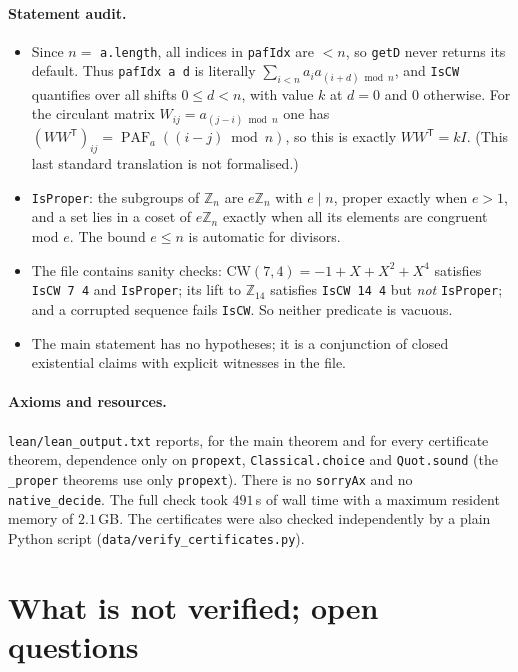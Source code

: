 \documentclass[11pt]{article}
\numberwithin{equation}{section}
\theoremstyle{definition}
\theoremstyle{remark}
\newcommand{\Z}{\mathbb Z}
\newcommand{\CW}{\mathrm{CW}}
\DeclareMathOperator{\PAF}{PAF}
\begin{document}
\paragraph{Statement audit.}
\begin{itemize}
\item Since $n=$ \texttt{a.length}, all indices in \texttt{pafIdx} are $<n$, so \texttt{getD}
never returns its default. Thus \texttt{pafIdx a d} is literally
$\sum_{i<n}a_ia_{(i+d)\bmod n}$, and \texttt{IsCW} quantifies over all shifts $0\le d<n$, with
value $k$ at $d=0$ and $0$ otherwise. For the circulant matrix $W_{ij}=a_{(j-i)\bmod n}$ one has
$(WW^{\mathsf T})_{ij}=\PAF_a((i-j)\bmod n)$, so this is exactly $WW^{\mathsf T}=kI$. (This last
standard translation is not formalised.)
\item \texttt{IsProper}: the subgroups of $\Z_n$ are $e\Z_n$ with $e\mid n$, proper exactly when
$e>1$, and a set lies in a coset of $e\Z_n$ exactly when all its elements are congruent mod $e$.
The bound $e\le n$ is automatic for divisors.
\item The file contains sanity checks: $\CW(7,4)=-1+X+X^2+X^4$ satisfies
\texttt{IsCW 7 4} and \texttt{IsProper}; its lift to $\Z_{14}$ satisfies \texttt{IsCW 14 4} but
\emph{not} \texttt{IsProper}; and a corrupted sequence fails \texttt{IsCW}. So neither predicate
is vacuous.
\item The main statement has no hypotheses; it is a conjunction of closed existential claims with
explicit witnesses in the file.
\end{itemize}

\paragraph{Axioms and resources.} \texttt{lean/lean\_output.txt} reports, for the main theorem and
for every certificate theorem, dependence only on \texttt{propext}, \texttt{Classical.choice} and
\texttt{Quot.sound} (the \texttt{\_proper} theorems use only \texttt{propext}). There is no
\texttt{sorryAx} and no \texttt{native\_decide}. The full check took $491$\,s of wall time with a
maximum resident memory of $2.1$\,GB. The certificates were also checked independently by a
plain Python script (\texttt{data/verify\_certificates.py}).

\section{What is not verified; open questions}\label{sec:limits}
\end{document}
